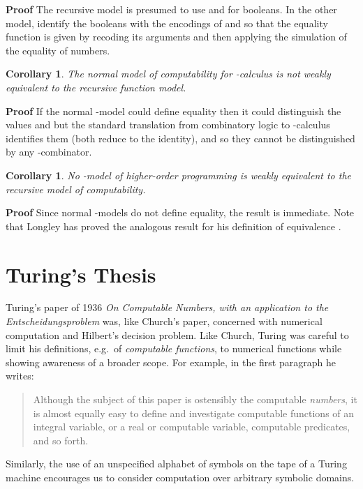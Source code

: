 \documentclass[a4paper]{article}
\newtheorem{corollary}[theorem]{Corollary}
\newenvironment{proof}
	{\par\noindent\upshape\textbf{Proof}\quad}
	{\hspace*{\fill}}
\begin{document}
\begin{proof}
  The recursive model is presumed to use  and  for booleans.  In
  the other model, identify the booleans with the encodings of  and
   so that the equality function is given by recoding its arguments
  and then applying the simulation of the equality of numbers.
\end{proof}

\begin{corollary}
\label{cor:SK-inequivalent}
The normal model of computability for -calculus is not weakly equivalent to the recursive
function model.
\end{corollary}

\begin{proof}
  If the normal -model could define equality then it could distinguish
  the values  and  but the standard translation from
  combinatory logic to -calculus identifies them (both reduce to
  the identity), and so they cannot be distinguished by any
  -combinator. 
\end{proof}


\begin{corollary}
\label{cor:lambda-inequivalent}
No -model of higher-order programming is weakly equivalent to the
recursive model of computability.
\end{corollary}

\begin{proof}
  Since normal -models do not define equality, the result is
  immediate. Note that Longley has proved the analogous result for his
  definition of equivalence \cite{Longley14}.
\end{proof}




\section{Turing's Thesis}  
\label{sec:Turing}

Turing's paper of 1936 {\em On Computable Numbers, with an application
  to the Entscheidungsproblem} was, like Church's paper, concerned
with numerical computation and Hilbert's decision problem. Like
Church, Turing was careful to limit his definitions, e.g.\ of {\em
  computable functions}, to numerical functions while showing
awareness of a broader scope. For example, in the first paragraph he
writes:
\begin{quote}
  Although the subject of this paper is ostensibly the computable {\em
    numbers}, it is almost equally easy to define and investigate
  computable functions of an integral variable, or a real or
  computable variable, computable predicates, and so
    forth.
\end{quote}
Similarly, the use of an unspecified
  alphabet of symbols on the tape of a Turing machine encourages us to
  consider computation over arbitrary symbolic domains.
\end{document}
